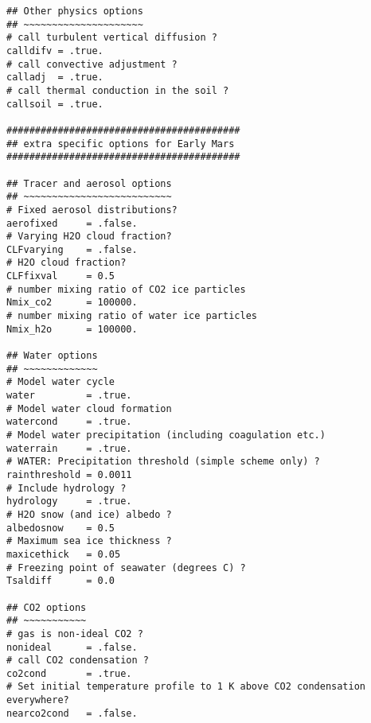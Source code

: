 {\begin{verbatim}
## Other physics options
## ~~~~~~~~~~~~~~~~~~~~~
# call turbulent vertical diffusion ?
calldifv = .true.
# call convective adjustment ?
calladj  = .true.
# call thermal conduction in the soil ?
callsoil = .true.

#########################################
## extra specific options for Early Mars
#########################################

## Tracer and aerosol options
## ~~~~~~~~~~~~~~~~~~~~~~~~~~
# Fixed aerosol distributions?
aerofixed     = .false.
# Varying H2O cloud fraction?
CLFvarying    = .false.
# H2O cloud fraction?
CLFfixval     = 0.5
# number mixing ratio of CO2 ice particles
Nmix_co2      = 100000.
# number mixing ratio of water ice particles
Nmix_h2o      = 100000.

## Water options
## ~~~~~~~~~~~~~
# Model water cycle
water         = .true.
# Model water cloud formation
watercond     = .true.
# Model water precipitation (including coagulation etc.)
waterrain     = .true.
# WATER: Precipitation threshold (simple scheme only) ?
rainthreshold = 0.0011
# Include hydrology ?
hydrology     = .true.
# H2O snow (and ice) albedo ?
albedosnow    = 0.5
# Maximum sea ice thickness ?
maxicethick   = 0.05
# Freezing point of seawater (degrees C) ?
Tsaldiff      = 0.0

## CO2 options
## ~~~~~~~~~~~
# gas is non-ideal CO2 ?
nonideal      = .false.
# call CO2 condensation ?
co2cond       = .true.
# Set initial temperature profile to 1 K above CO2 condensation everywhere?
nearco2cond   = .false.

\end{verbatim}
}

